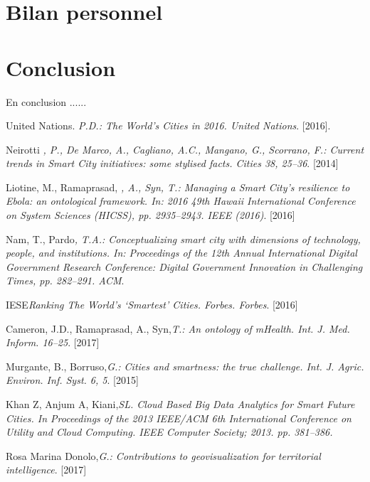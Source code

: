 \documentclass[french, a4paper, 12pt]{report}
\begin{document}
\section{Bilan personnel}
\section{Conclusion}
En conclusion ...... 

% 
%  
{} 
\begin{thebibliography}{9}
United Nations. \emph{P.D.: The World’s Cities in 2016. United Nations}. [2016].

 Neirotti \emph{, P., De Marco, A., Cagliano, A.C., Mangano, G., Scorrano, F.: Current trends in Smart City initiatives: some stylised facts. Cities 38, 25–36}. [2014]


  Liotine, M., Ramaprasad, \emph{, A., Syn, T.: Managing a Smart City’s resilience to Ebola: an ontological framework. In: 2016 49th Hawaii International Conference on System Sciences (HICSS), pp. 2935–2943. IEEE (2016)}. [2016]

 Nam, T., Pardo\emph{, T.A.: Conceptualizing smart city with dimensions of technology, people, and institutions. In: Proceedings of the 12th Annual International Digital Government Research Conference: Digital Government Innovation in Challenging Times, pp. 282–291. ACM}.

IESE\emph{Ranking The World’s ‘Smartest’ Cities. Forbes. Forbes}. [2016]

Cameron, J.D., Ramaprasad, A., Syn,\emph{T.: An ontology of mHealth. Int. J. Med. Inform. 16–25}. [2017]

 Murgante, B., Borruso,\emph{G.: Cities and smartness: the true challenge. Int. J. Agric. Environ. Inf. Syst. 6, 5}. [2015]

Khan Z, Anjum A, Kiani,\emph{SL. Cloud Based Big Data Analytics for Smart Future Cities. In Proceedings of the 2013 IEEE/ACM 6th International Conference on Utility and Cloud Computing. IEEE Computer Society; 2013. pp. 381–386.}

 Rosa Marina Donolo,\emph{G.: Contributions to geovisualization for territorial
intelligence}. [2017]


\end{thebibliography}
\end{document}
